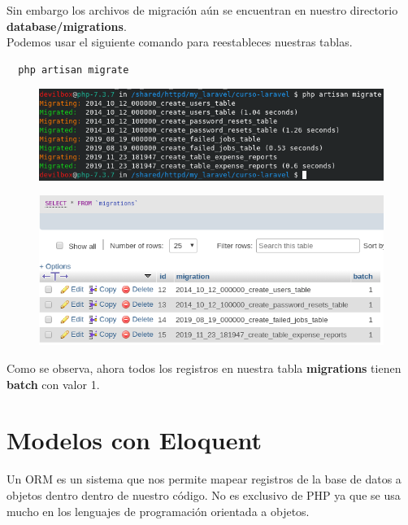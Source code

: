\documentclass{article}
\begin{document}
Sin embargo los archivos de migración aún se encuentran en nuestro directorio
\textbf{database/migrations}.\\
Podemos usar el siguiente comando para reestableces nuestras tablas.\\

\begin{verbatim}
  php artisan migrate
\end{verbatim}

\begin{figure}[h!]
  \centering
  \includegraphics[scale=0.5]{./Pictures/036_migrate_again.png}
\end{figure}

\begin{figure}[h!]
  \centering
  \includegraphics[scale=0.5]{./Pictures/037_migrations_table.png}
\end{figure}

Como se observa, ahora todos los registros en nuestra tabla \textbf{migrations}
tienen \textbf{batch} con valor 1.


\section{Modelos con Eloquent}%
Un ORM es un sistema que nos permite mapear registros de la base de datos a
objetos dentro dentro de nuestro código. No es exclusivo de PHP ya que se usa
mucho en los lenguajes de programación orientada a objetos.\\
\end{document}
